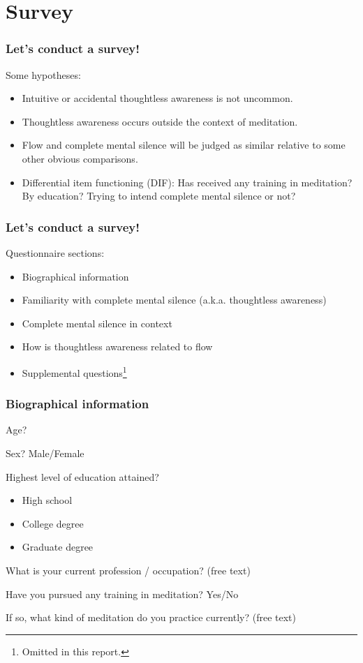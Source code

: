 \documentclass[10pt,utf8x]{beamer}
\begin{document}
\section{Survey}

\begin{frame}
\frametitle{Let's conduct a survey!}

Some hypotheses:
\begin{itemize}
\item Intuitive or accidental thoughtless awareness is not uncommon.
\item Thoughtless awareness occurs outside the context of meditation.
\item Flow and complete mental silence will be judged as similar relative
  to some other obvious comparisons.
\item Differential item functioning (DIF):
Has received any training in meditation? By education?
Trying to intend complete mental silence or not?
\end{itemize}
\end{frame}

\begin{frame}
\frametitle{Let's conduct a survey!}
Questionnaire sections:
\begin{itemize}
\item Biographical information
\item Familiarity with complete mental silence (a.k.a. thoughtless awareness)
\item Complete mental silence in context
\item How is thoughtless awareness related to flow
\item Supplemental questions\footnote{Omitted in this report.}
\end{itemize}
\end{frame}

\begin{frame}
  \frametitle{Biographical information}
Age?

Sex? Male/Female

Highest level of education attained?
\begin{itemize}
\item High school
\item College degree
\item Graduate degree
\end{itemize}

What is your current profession / occupation? (free text)

Have you pursued any training in meditation? Yes/No

If so, what kind of meditation do you practice currently? (free text)
\end{frame}
\end{document}

